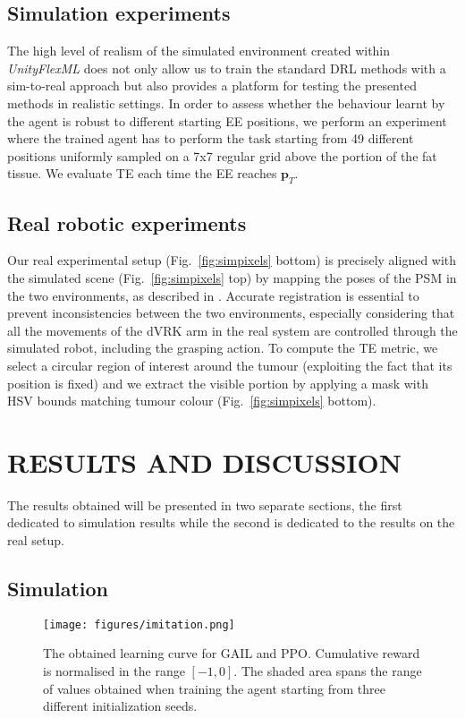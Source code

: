 \documentclass[letterpaper, 10 pt, conference]{ieeeconf}
\begin{document}
\subsection{Simulation experiments \label{sec:experiment_Sim}}
The high level of realism of the simulated environment created within \textit{UnityFlexML} does not only allow us to train the standard DRL methods with a sim-to-real approach but also provides a platform for testing the presented methods in realistic settings. 
In order to assess whether the behaviour learnt by the agent is robust to different starting EE positions, we perform an experiment where the trained agent has to perform the task starting from 49 different positions uniformly sampled on a 7x7 regular grid above the portion of the fat tissue. We evaluate TE each time the EE reaches $\mathbf{p}_T$.
  
\subsection{Real robotic experiments \label{sec:experiment_real}}
Our real experimental setup (Fig.~\ref{fig:simpixels} bottom) is precisely aligned with the simulated scene (Fig.~\ref{fig:simpixels} top) by mapping the poses of the PSM in the two environments, as described in \cite{piccinelli2020}. Accurate registration is essential to prevent inconsistencies between the two environments, especially considering that all the movements of the dVRK arm in the real system are controlled through the simulated robot, including the grasping action.
To compute the TE metric, we select a circular region of interest around the tumour (exploiting the fact that its position is fixed) and we extract the visible portion by applying a mask with HSV bounds matching tumour colour (Fig.~\ref{fig:simpixels} bottom).

\section{RESULTS AND DISCUSSION\label{sec:results}}
The results obtained will be presented in two separate sections, the first dedicated to simulation results while the second is dedicated to the results on the real setup.

\subsection{Simulation \label{sec:results_sim}}
\begin{figure}[thpb]
	\centering
	\texttt{[image: figures/imitation.png]}
	\caption{The obtained learning curve for GAIL and PPO. Cumulative reward is normalised in the range $[-1,0]$. The shaded area spans the range of values obtained when training the agent starting from three different initialization seeds.} 
	\label{fig:curve1}
\end{figure}
\end{document}
